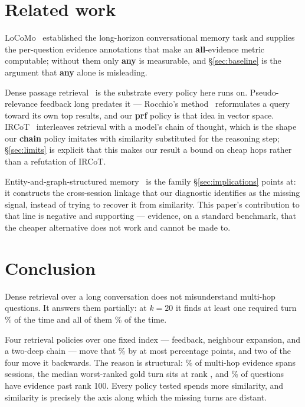 \section{Related work}
\label{sec:related}

LoCoMo~\cite{locomo} established the long-horizon conversational memory task and
supplies the per-question evidence annotations that make an \textbf{all}-evidence
metric computable; without them only \textbf{any} is measurable, and
\S\ref{sec:baseline} is the argument that \textbf{any} alone is misleading.

Dense passage retrieval~\cite{dpr} is the substrate every policy here runs on.
Pseudo-relevance feedback long predates it --- Rocchio's method~\cite{rocchio}
reformulates a query toward its own top results, and our \textbf{prf} policy is
that idea in vector space. IRCoT~\cite{ircot} interleaves retrieval with a
model's chain of thought, which is the shape our \textbf{chain} policy imitates
with similarity substituted for the reasoning step; \S\ref{sec:limits} is
explicit that this makes our result a bound on cheap hops rather than a
refutation of IRCoT.

Entity-and-graph-structured memory~\cite{hipporag} is the family
\S\ref{sec:implications} points at: it constructs the cross-session linkage that
our diagnostic identifies as the missing signal, instead of trying to recover it
from similarity. This paper's contribution to that line is negative and
supporting --- evidence, on a standard benchmark, that the cheaper alternative
does not work and cannot be made to.

\section{Conclusion}
\label{sec:conclusion}

Dense retrieval over a long conversation does not misunderstand multi-hop
questions. It answers them partially: at $k{=}20$ it finds at least one required
turn \rManyTwenty{}\% of the time and all of them \rMallTwenty{}\% of the time.

Four retrieval policies over one fixed index --- feedback, neighbour expansion,
and a two-deep chain --- move that \rMallTwenty{}\% by at most \rBestDelta{}
percentage points, and two of the four move it backwards. The reason is
structural: \rSpanSessions{}\% of multi-hop evidence spans sessions, the median
worst-ranked gold turn sits at rank \rMedWorst{}, and \rBeyondHundred{}\% of
questions have evidence past rank 100. Every policy tested spends more
similarity, and similarity is precisely the axis along which the missing turns
are distant.


